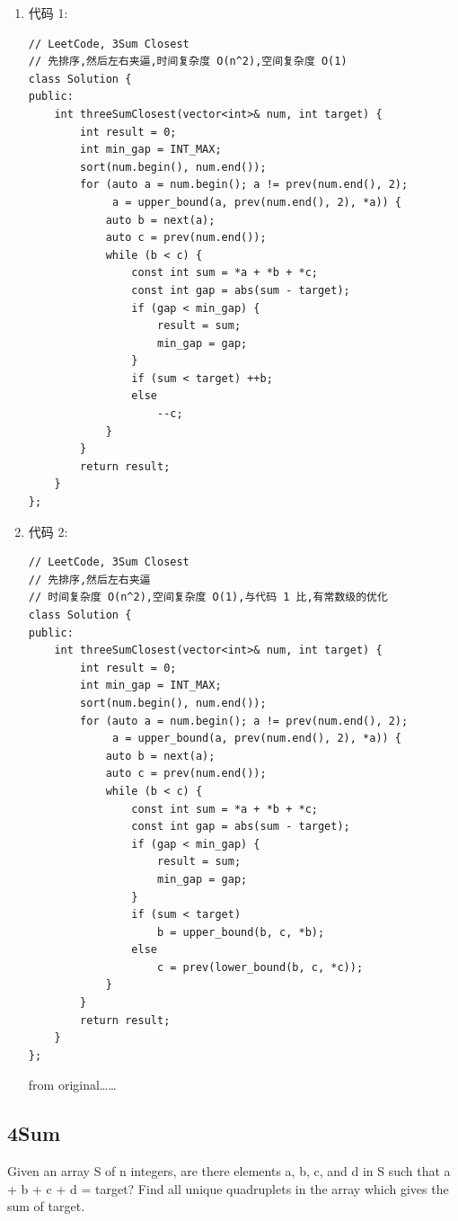 \documentclass[12pt]{book}
\begin{document}
\begin{enumerate}
\item 代码 1:
\label{sec-15-2-2-1}

\lstset{language=java,label= ,caption= ,numbers=none}
\begin{lstlisting}
// LeetCode, 3Sum Closest
// 先排序,然后左右夹逼,时间复杂度 O(n^2),空间复杂度 O(1)
class Solution {
public:
    int threeSumClosest(vector<int>& num, int target) {
        int result = 0;
        int min_gap = INT_MAX;
        sort(num.begin(), num.end());
        for (auto a = num.begin(); a != prev(num.end(), 2);
             a = upper_bound(a, prev(num.end(), 2), *a)) {
            auto b = next(a);
            auto c = prev(num.end());
            while (b < c) {
                const int sum = *a + *b + *c;
                const int gap = abs(sum - target);
                if (gap < min_gap) {
                    result = sum;
                    min_gap = gap;
                }
                if (sum < target) ++b;
                else
                    --c;
            }
        }
        return result;
    }
};
\end{lstlisting}

\item 代码 2:
\label{sec-15-2-2-2}
\lstset{language=java,label= ,caption= ,numbers=none}
\begin{lstlisting}
// LeetCode, 3Sum Closest
// 先排序,然后左右夹逼
// 时间复杂度 O(n^2),空间复杂度 O(1),与代码 1 比,有常数级的优化
class Solution {
public:
    int threeSumClosest(vector<int>& num, int target) {
        int result = 0;
        int min_gap = INT_MAX;
        sort(num.begin(), num.end());
        for (auto a = num.begin(); a != prev(num.end(), 2);
             a = upper_bound(a, prev(num.end(), 2), *a)) {
            auto b = next(a);
            auto c = prev(num.end());
            while (b < c) {
                const int sum = *a + *b + *c;
                const int gap = abs(sum - target);
                if (gap < min_gap) {
                    result = sum;
                    min_gap = gap;
                }
                if (sum < target)
                    b = upper_bound(b, c, *b);
                else
                    c = prev(lower_bound(b, c, *c));
            }
        }
        return result;
    }
};
\end{lstlisting}
from original\ldots{}\ldots{}
\end{enumerate}

\subsection{4Sum}
\label{sec-15-2-3}
Given an array S of n integers, are there elements a, b, c, and d in S such that a + b + c + d = target? Find all unique quadruplets in the array which gives the sum of target.
\end{document}
